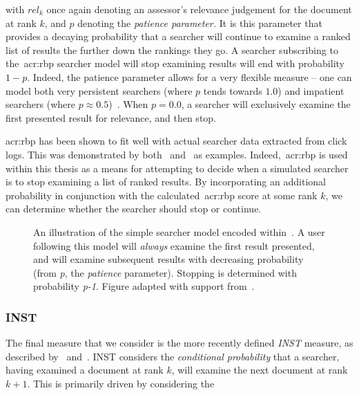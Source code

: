 with $rel_k$ once again denoting an assessor's relevance judgement for the document at rank $k$, and $p$ denoting the \emph{patience parameter.} It is this parameter that provides a decaying probability that a searcher will continue to examine a ranked list of results the further down the rankings they go. A searcher subscribing to the~\gls{acr:rbp} searcher model will stop examining results will end with probability $1-p$. Indeed, the patience parameter allows for a very flexible measure -- one can model both very persistent searchers (where $p$ tends towards $1.0$) and impatient searchers (where $p\approx0.5$)~\citep{moffat2008rbp}. When $p=0.0$, a searcher will exclusively examine the first presented result for relevance, and then stop.

\gls{acr:rbp} has been shown to fit well with actual searcher data extracted from click logs. This was demonstrated by both~\cite{chapelle2009rbp} and~\cite{zhang2010click_rbp} as examples. Indeed,~\gls{acr:rbp} is used within this thesis as a means for attempting to decide when a simulated searcher is to stop examining a list of ranked results. By incorporating an additional probability in conjunction with the calculated~\gls{acr:rbp} score at some rank $k$, we can determine whether the searcher should stop or continue.

\begin{figure}[t!]
    \centering
    \caption[Rank-Biased Precision]{An illustration of the simple searcher model encoded within~. A user following this model will \emph{always} examine the first result presented, and will examine subsequent results with decreasing probability (from \emph{p}, the \emph{patience} parameter). Stopping is determined with probability \emph{p-1}. Figure adapted with support from~\cite{moffat2008rbp}.}
    \label{fig:rbp}
\end{figure}

\vspace{-4mm}
\subsubsection{INST}
The final measure that we consider is the more recently defined \emph{INST} measure, as described by~\cite{bailey2015inst} and~\cite{moffat2015inst}. INST considers the \emph{conditional probability} that a searcher, having examined a document at rank $k$, will examine the next document at rank $k+1$. This is primarily driven by considering the

